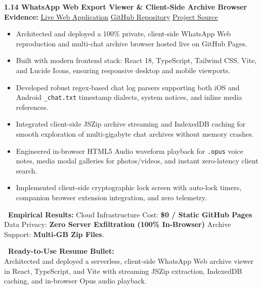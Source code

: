\documentclass[10pt,a4paper]{article}
\newcommand{\statuscompleted}{\tcbox[on line, colback=completedbg, colframe=completed!50!white, size=small, arc=2pt, boxrule=0.5pt]{\scriptsize\bfseries\color{completed}\faIcon{check-circle}\ COMPLETED / SUBSTANTIAL}}
\begin{document}
\begin{projectcard}
  \textbf{\large 1.14 WhatsApp Web Export Viewer \& Client-Side Archive Browser} \hfill \statuscompleted\\[2pt]
  {\footnotesize\color{textmuted}\textbf{Evidence:} \href{https://siddhu-123.github.io/whatsapp-clone/}{\underline{Live Web Application}} \quad\textbar\quad \href{https://github.com/Siddhu-123/whatsapp-clone}{\underline{GitHub Repository}} \quad\textbar\quad \underline{Project Source}}
  \begin{itemize}[leftmargin=14pt, itemsep=1.5pt, topsep=2pt]
    \item Architected and deployed a 100\% private, client-side WhatsApp Web reproduction and multi-chat archive browser hosted live on GitHub Pages.
    \item Built with modern frontend stack: React 18, TypeScript, Tailwind CSS, Vite, and Lucide Icons, ensuring responsive desktop and mobile viewports.
    \item Developed robust regex-based chat log parsers supporting both iOS and Android \texttt{\_chat.txt} timestamp dialects, system notices, and inline media references.
    \item Integrated client-side JSZip archive streaming and IndexedDB caching for smooth exploration of multi-gigabyte chat archives without memory crashes.
    \item Engineered in-browser HTML5 Audio waveform playback for \texttt{.opus} voice notes, media modal galleries for photos/videos, and instant zero-latency client search.
    \item Implemented client-side cryptographic lock screen with auto-lock timers, companion browser extension integration, and zero telemetry.
  \end{itemize}
  \begin{metricsbox}
    \textbf{\ Empirical Results:} Cloud Infrastructure Cost: \textbf{\$0 / Static GitHub Pages} \quad\textbar\quad Data Privacy: \textbf{Zero Server Exfiltration (100\% In-Browser)} \quad\textbar\quad Archive Support: \textbf{Multi-GB Zip Files}.
  \end{metricsbox}
  \begin{resumebox}
    \textbf{\color{accent}\ Ready-to-Use Resume Bullet:}\\
    Architected and deployed a serverless, client-side WhatsApp Web archive viewer in React, TypeScript, and Vite with streaming JSZip extraction, IndexedDB caching, and in-browser Opus audio playback.
  \end{resumebox}
\end{projectcard}
\end{document}
